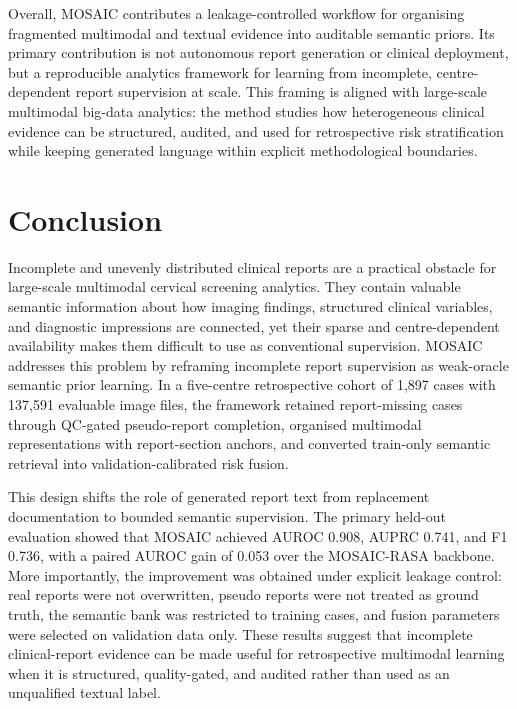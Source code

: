 \documentclass[11pt, a4paper]{article}
\theoremstyle{plain}
\theoremstyle{definition}
\begin{document}
Overall, MOSAIC contributes a leakage-controlled workflow for organising fragmented multimodal and textual evidence into auditable semantic priors. Its primary contribution is not autonomous report generation or clinical deployment, but a reproducible analytics framework for learning from incomplete, centre-dependent report supervision at scale. This framing is aligned with large-scale multimodal big-data analytics: the method studies how heterogeneous clinical evidence can be structured, audited, and used for retrospective risk stratification while keeping generated language within explicit methodological boundaries.

\section{Conclusion}
\label{sec:con}

Incomplete and unevenly distributed clinical reports are a practical obstacle for large-scale multimodal cervical screening analytics. They contain valuable semantic information about how imaging findings, structured clinical variables, and diagnostic impressions are connected, yet their sparse and centre-dependent availability makes them difficult to use as conventional supervision. MOSAIC addresses this problem by reframing incomplete report supervision as weak-oracle semantic prior learning. In a five-centre retrospective cohort of 1,897 cases with 137,591 evaluable image files, the framework retained report-missing cases through QC-gated pseudo-report completion, organised multimodal representations with report-section anchors, and converted train-only semantic retrieval into validation-calibrated risk fusion.

This design shifts the role of generated report text from replacement documentation to bounded semantic supervision. The primary held-out evaluation showed that MOSAIC achieved AUROC 0.908, AUPRC 0.741, and F1 0.736, with a paired AUROC gain of 0.053 over the MOSAIC-RASA backbone. More importantly, the improvement was obtained under explicit leakage control: real reports were not overwritten, pseudo reports were not treated as ground truth, the semantic bank was restricted to training cases, and fusion parameters were selected on validation data only. These results suggest that incomplete clinical-report evidence can be made useful for retrospective multimodal learning when it is structured, quality-gated, and audited rather than used as an unqualified textual label.
\end{document}
